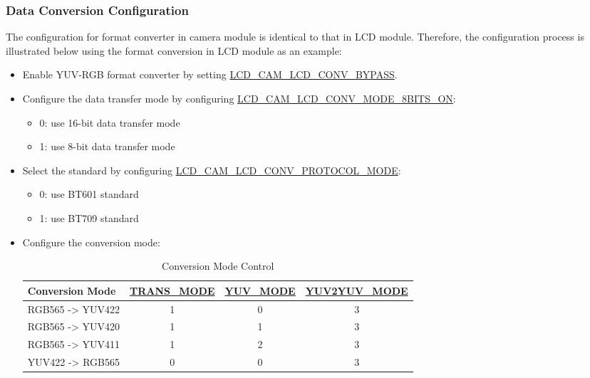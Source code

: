 \documentclass[main\_\_EN.tex]{subfiles}
\begin{document}
\subsubsection{Data Conversion Configuration}
The configuration for format converter in camera module is identical to that in LCD module. Therefore, the configuration process is illustrated below using the format conversion in LCD module as an example:
\begin{itemize}
    \item Enable YUV-RGB format converter by setting  \hyperref[fielddesc:LCDCAMLCDCONVBYPASS]{LCD\_CAM\_LCD\_CONV\_BYPASS}.
    \item Configure the data transfer mode by configuring \hyperref[fielddesc:LCDCAMLCDCONVMODE8BITSON]{LCD\_CAM\_LCD\_CONV\_MODE\_8BITS\_ON}:
    \begin{itemize}
        \item 0: use 16-bit data transfer mode
        \item 1: use 8-bit data transfer mode
    \end{itemize}
    \item Select the standard by configuring \hyperref[fielddesc:LCDCAMLCDCONVPROTOCOLMODE]{LCD\_CAM\_LCD\_CONV\_PROTOCOL\_MODE}:
    \begin{itemize}
        \item 0: use BT601 standard
        \item 1: use BT709 standard
    \end{itemize}
    \item Configure the conversion mode:
    \begin{table}[H]
        \caption{Conversion Mode Control}
        \centering
        \begin{threeparttable}
        \begin{tabular}{|l|c|c|c|}
        \hline
        \rowcolor{lightgray}
        \textbf{Conversion Mode} & \textbf{\hyperref[fielddesc:LCDCAMLCDCONVTRANSMODE]{TRANS\_MODE}}\tnote{1} & \textbf{\hyperref[fielddesc:LCDCAMLCDCONVYUVMODE]{YUV\_MODE}}\tnote{2} & \textbf{\hyperref[fielddesc:LCDCAMLCDCONVYUV2YUVMODE]{YUV2YUV\_MODE}}\tnote{3} \\ \hline
        RGB565 -> YUV422 & 1 & 0 & 3 \\ \hline
        RGB565 -> YUV420 & 1 & 1 & 3 \\ \hline
        RGB565 -> YUV411 & 1 & 2 & 3 \\ \hline
        YUV422 -> RGB565 & 0 & 0 & 3 \\ \hline

\end{tabular}
\end{threeparttable}
\end{table}
\end{itemize}
\end{document}

